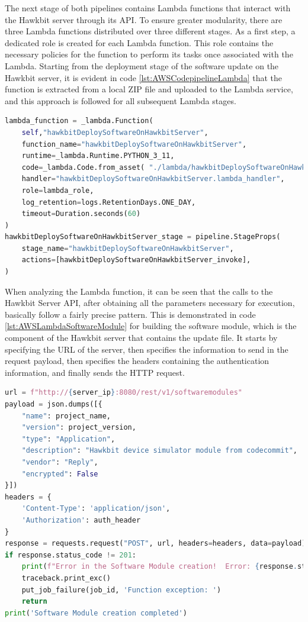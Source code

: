 The next stage of both pipelines contains Lambda functions that interact with the Hawkbit server through its API. To ensure greater modularity, there are three Lambda functions distributed over three different stages. As a first step, a dedicated role is created for each Lambda function. This role contains the necessary policies for the function to perform its tasks once associated with the Lambda.
Starting from the deployment stage of the software update on the Hawkbit server, it is evident in code \ref{lst:AWSCodepipelineLambda} that the function is extracted from a local ZIP file and uploaded to the Lambda service, and this approach is followed for all subsequent Lambda stages.
\begin{lstlisting}[language=Python, caption={CDK Code for the deploy software on Hawkbit server Lambda creation}, label=lst:AWSCodepipelineLambda]
lambda_function = _lambda.Function(
    self,"hawkbitDeploySoftwareOnHawkbitServer",
    function_name="hawkbitDeploySoftwareOnHawkbitServer",
    runtime=_lambda.Runtime.PYTHON_3_11,
    code=_lambda.Code.from_asset( "./lambda/hawkbitDeploySoftwareOnHawkbitServer.zip"),
    handler="hawkbitDeploySoftwareOnHawkbitServer.lambda_handler",
    role=lambda_role,
    log_retention=logs.RetentionDays.ONE_DAY,
    timeout=Duration.seconds(60)
)
hawkbitDeploySoftwareOnHawkbitServer_stage = pipeline.StageProps(
    stage_name="hawkbitDeploySoftwareOnHawkbitServer",
    actions=[hawkbitDeploySoftwareOnHawkbitServer_invoke],
)
\end{lstlisting}

When analyzing the Lambda function, it can be seen that the calls to the Hawkbit Server API, after obtaining all the parameters necessary for execution, basically follow a fairly precise pattern. This is demonstrated in code \ref{lst:AWSLambdaSoftwareModule} for building the software module, which is the component of the Hawkbit server that contains the update file. It starts by specifying the URL of the server, then specifies the information to send in the request payload, then specifies the headers containing the authentication information, and finally sends the HTTP request.
\begin{lstlisting}[language=Python, caption={Lambda code for the software module creation}, label=lst:AWSLambdaSoftwareModule]
url = f"http://{server_ip}:8080/rest/v1/softwaremodules"
payload = json.dumps([{
    "name": project_name,
    "version": project_version,
    "type": "Application",
    "description": "Hawkbit device simulator module from codecommit",
    "vendor": "Reply",
    "encrypted": False
}])
headers = {
    'Content-Type': 'application/json',
    'Authorization': auth_header
}
response = requests.request("POST", url, headers=headers, data=payload)
if response.status_code != 201:
    print(f"Error in the Software Module creation!  Error: {response.status_code}")
    traceback.print_exc()
    put_job_failure(job_id, 'Function exception: ')
    return
print('Software Module creation completed')
\end{lstlisting}


